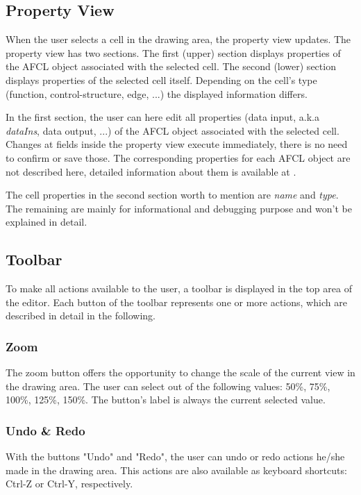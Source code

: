 \documentclass[a4paper,12pt,pdftex,halfparskip,cleardoubleempty,bibtotoc,liststotoc]{scrbook}
\begin{document}
\subsection{Property View}

When the user selects a cell in the drawing area, the property view updates. The property view has two sections. The first (upper) section displays properties of the AFCL object associated with the selected cell. The second (lower) section displays properties of the selected cell itself. Depending on the cell's type (function, control-structure, edge, ...) the displayed information differs.

In the first section, the user can here edit all properties (data input, a.k.a \textit{dataIns}, data output, ...) of the AFCL object associated with the selected cell. Changes at fields inside the property view execute immediately, there is no need to confirm or save those.
The corresponding properties for each AFCL object are not described here, detailed information about them is available at \citep{online-afcl-dps}.

The cell properties in the second section worth to mention are \textit{name} and \textit{type}. The remaining are mainly for informational and debugging purpose and won't be explained in detail.

\subsection{Toolbar}

To make all actions available to the user, a toolbar is displayed in the top area of the editor. Each button of the toolbar represents one or more actions, which are described in detail in the following.

\subsubsection{Zoom}

The zoom button offers the opportunity to change the scale of the current view in the drawing area. The user can select out of the following values: 50\%, 75\%, 100\%, 125\%, 150\%. The button's label is always the current selected value.

\subsubsection{Undo \& Redo}

With the buttons "Undo" and "Redo", the user can undo or redo actions he/she made in the drawing area. This actions are also available as keyboard shortcuts: \textsf{Ctrl-Z} or \textsf{Ctrl-Y}, respectively.
\end{document}
